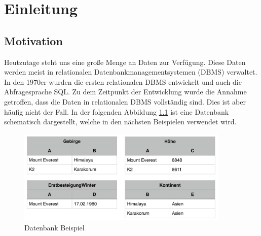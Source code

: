 \documentclass[draft,final]{vutinfth} %
\newcommand{\todo}[1]{{\color{red}\textbf{TODO: {#1}}}} %
\begin{document}
\frontmatter %

\addstatementpage

%
%
%


\tableofcontents %

\mainmatter

\chapter{Einleitung}
\section*{Motivation}
Heutzutage steht uns eine gro\ss e Menge an Daten zur Verfügung. Diese Daten werden meist in relationalen Datenbankmanagementsystemen (DBMS) verwaltet. In den 1970er wurden die ersten relationalen DBMS entwickelt und auch die Abfragesprache SQL. Zu dem Zeitpunkt der Entwicklung wurde die Annahme getroffen, dass die Daten in relationalen DBMS vollständig sind. Dies ist aber häufig nicht der Fall. In der folgenden Abbildung \ref{dbBsp} ist eine Datenbank schematisch dargestellt, welche in den nächsten Beispielen verwendet wird.

\begin{figure}[ht]
	\centering
	\includegraphics[width=0.9\textwidth]{DB-Beispiel}
	\caption{Datenbank Beispiel}
	\label{dbBsp}
\end{figure}
\end{document}
